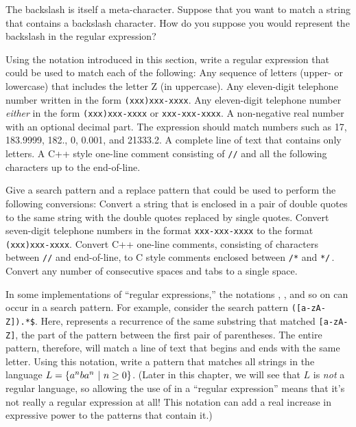 \begin{exercises}

\problem The backslash is itself a meta-character.  Suppose that
you want to match a string that contains a backslash
character.  How do you suppose you would represent the backslash in
the regular expression?

\problem Using the notation introduced in this section,
write a regular expression that could be used to match
each of the following:
\ppart Any sequence of letters (upper- or lowercase) that
includes the letter Z (in uppercase).
\ppart Any eleven-digit telephone number written in the form
\texttt{(xxx)xxx-xxxx}.
\ppart Any eleven-digit telephone number \textit{either}
in the form \texttt{(xxx)xxx-xxxx} or \texttt{xxx-xxx-xxxx}.
\ppart A non-negative real number with an optional decimal
part.  The expression should match numbers such as
17, 183.9999, 182., 0, 0.001, and 21333.2.
\ppart A complete line of  text that contains only letters.
\ppart A C++ style one-line comment consisting of \texttt{//} and all the
following characters up to the end-of-line.

\problem Give a search pattern and a replace pattern that could
be used to perform the following conversions:
\ppart Convert a string that is enclosed in a pair of double quotes to
the same string with the double quotes replaced by single quotes.
\ppart Convert seven-digit telephone numbers in the format
\texttt{xxx-xxx-xxxx} to the format \texttt{(xxx)xxx-xxxx}.
\ppart Convert C++ one-line comments, consisting of characters
between \texttt{//} and end-of-line, to C style comments enclosed
between \texttt{/*} and \texttt{*/}$\,$.
\ppart Convert any number of consecutive spaces and tabs to
a single space.

\problem In some implementations of ``regular expressions,'' the
notations \texttt{}, \texttt{}, and so on can occur
in a search pattern.  For example, consider the search pattern
\texttt{\sol([a-zA-Z]).*\$}.  Here, \texttt{} represents
a recurrence of the same substring that matched \texttt{[a-zA-Z]},
the part of the pattern between the first pair of parentheses.
The entire pattern, therefore, will match a line of text that
begins and ends with the same letter.  Using this notation,
write a pattern that matches all strings in the language
$L=\{a^nba^n\,\,|\,\,n\ge0\}$.  (Later in this chapter, we will
see that $L$ is \textit{not} a regular language, so allowing the
use of \texttt{} in a ``regular expression'' means that it's
not really a regular expression at all!  This notation can add
a real increase in expressive power to the patterns that contain it.)

\end{exercises}


